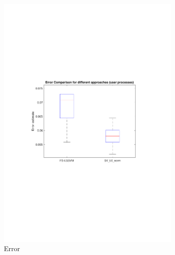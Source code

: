 \documentclass{article}
\begin{document}
\begin{figure}[h]
\begin{subfigure}[b]{0.3\textwidth}
             \end{subfigure}
            \hfill
             \begin{subfigure}[b]{0.3\textwidth}
                 \centering 
                 \includegraphics[width=\textwidth]{Assignment 3/figures/1_3/error_comparison.pdf}
                 \caption{Error}
                 \label{fig:l0error}
             \end{subfigure}
             \hfill
             \begin{subfigure}[b]{0.3\textwidth}
                 \centering

\end{subfigure}
\end{figure}
\end{document}

